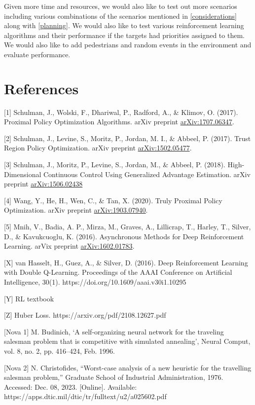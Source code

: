 \documentclass{article}
\begin{document}
	Given more time and resources, we would also like to test out more scenarios including various combinations of the scenarios mentioned in \ref{considerations} along with \ref{planning}. We would also like to test various reinforcement learning algorithms and their performance if the targets had priorities assigned to them. We would also like to add pedestrians and random events in the environment and evaluate performance.
	
	\section*{References}
	
	
	[1] Schulman, J., Wolski, F., Dhariwal, P., Radford, A., \& Klimov, O. (2017). Proximal Policy Optimization Algorithms. arXiv preprint \href{https://arxiv.org/abs/1707.06347}{arXiv:1707.06347}.
	
	[2] Schulman, J., Levine, S., Moritz, P., Jordan, M. I., \& Abbeel, P. (2017). Trust Region Policy Optimization. arXiv preprint \href{https://arxiv.org/abs/1502.05477}{arXiv:1502.05477}.
	
	[3] Schulman, J., Moritz, P., Levine, S., Jordan, M., \& Abbeel, P. (2018). High-Dimensional Continuous Control Using Generalized Advantage Estimation. arXiv preprint \href{https://arxiv.org/abs/1506.02438}{arXiv:1506.02438}
	
	[4] Wang, Y., He, H., Wen, C., \& Tan, X. (2020). Truly Proximal Policy Optimization. arXiv preprint \href{https://arxiv.org/abs/1903.07940}{arXiv:1903.07940}.
	
	[5] Mnih, V., Badia, A. P., Mirza, M., Graves, A., Lillicrap, T., Harley, T., Silver, D., \& Kavukcuoglu, K. (2016). Asynchronous Methods for Deep Reinforcement Learning. arVix preprint \href{https://arxiv.org/abs/1602.01783}{arXiv:1602.01783}.
	
	[X] van Hasselt, H., Guez, A., \& Silver, D. (2016). Deep Reinforcement Learning with Double Q-Learning. Proceedings of the AAAI Conference on Artificial Intelligence, 30(1). https://doi.org/10.1609/aaai.v30i1.10295
	
	[Y] RL textbook
	
	[Z] Huber Loss. https://arxiv.org/pdf/2108.12627.pdf 
	
	[Nova 1]
	M. Budinich, ‘A self-organizing neural network for the traveling salesman problem that is competitive with simulated annealing’, Neural Comput, vol. 8, no. 2, pp. 416–424, Feb. 1996.
	
	[Nova 2] N. Christofides, “Worst-case analysis of a new heuristic for the travelling salesman problem,” Graduate School of Industrial Administration, 1976. Accessed: Dec. 08, 2023. [Online]. Available: https://apps.dtic.mil/dtic/tr/fulltext/u2/a025602.pdf
	
\end{document}
